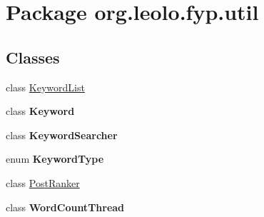 \hypertarget{namespaceorg_1_1leolo_1_1fyp_1_1util}{\section{Package org.\-leolo.\-fyp.\-util}
\label{namespaceorg_1_1leolo_1_1fyp_1_1util}
}
\subsection*{Classes}
\begin{DoxyCompactItemize}
\item 
class \hyperlink{classorg_1_1leolo_1_1fyp_1_1util_1_1_keyword_list}{Keyword\-List}
\item 
class {\bfseries Keyword}
\item 
class {\bfseries Keyword\-Searcher}
\item 
enum {\bfseries Keyword\-Type}
\item 
class \hyperlink{classorg_1_1leolo_1_1fyp_1_1util_1_1_post_ranker}{Post\-Ranker}
\item 
class {\bfseries Word\-Count\-Thread}
\end{DoxyCompactItemize}
